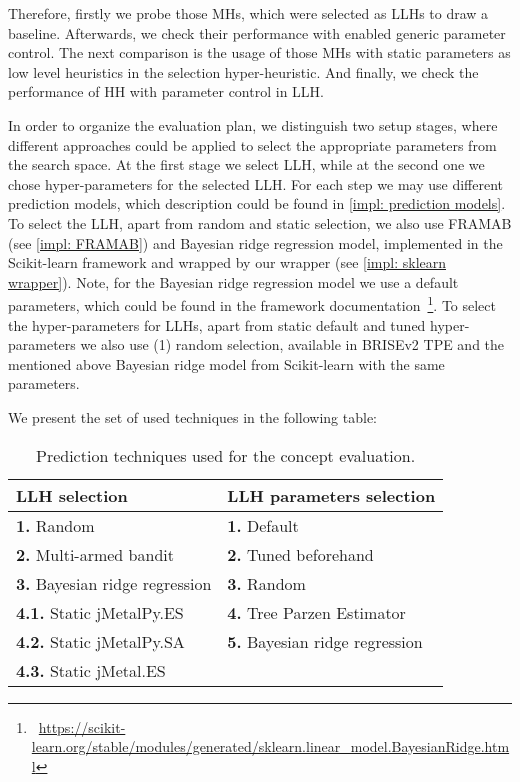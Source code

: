 Therefore, firstly we probe those MHs, which were selected as LLHs to draw a baseline. Afterwards, we check their performance with enabled generic parameter control. The next comparison is the usage of those MHs with static parameters as low level heuristics in the selection hyper-heuristic. And finally, we check the performance of HH with parameter control in LLH.

In order to organize the evaluation plan, we distinguish two setup stages, where different approaches could be applied to select the appropriate parameters from the search space. 
At the first stage we select LLH, while at the second one we chose hyper-parameters for the selected LLH. For each step we may use different prediction models, which description could be found in \cref{impl: prediction models}. To select the LLH, apart from random and static selection, we also use FRAMAB (see \cref{impl: FRAMAB}) and Bayesian ridge regression model, implemented in the Scikit-learn framework and wrapped by our wrapper (see \cref{impl: sklearn wrapper}). Note, for the Bayesian ridge regression model we use a default parameters, which could be found in the framework documentation~\footnote{~\url{https://scikit-learn.org/stable/modules/generated/sklearn.linear_model.BayesianRidge.html}}. To select the hyper-parameters for LLHs, apart from static default and tuned hyper-parameters we also use (1) random selection, available in BRISEv2 TPE and the mentioned above Bayesian ridge model from Scikit-learn with the same parameters.

We present the set of used techniques in the following table:
\begin{table}[h!]
	\centering
	\begin{tabular}{l||l}
		\textbf{LLH selection} & \textbf{LLH parameters selection} \\
		\hline
		\hline
		\textbf{1.} Random & \textbf{1.} Default \\
		\textbf{2.} Multi-armed bandit & \textbf{2.} Tuned beforehand \\
		\textbf{3.} Bayesian ridge regression & \textbf{3.} Random \\
		\textbf{4.1.} Static jMetalPy.ES & \textbf{4.} Tree Parzen Estimator \\
		\textbf{4.2.} Static jMetalPy.SA & \textbf{5.} Bayesian ridge regression\\
		\textbf{4.3.} Static jMetal.ES & 
	\end{tabular}
	
	\caption{Prediction techniques used for the concept evaluation.}
	\label{eval: concept settings table}
\end{table}


